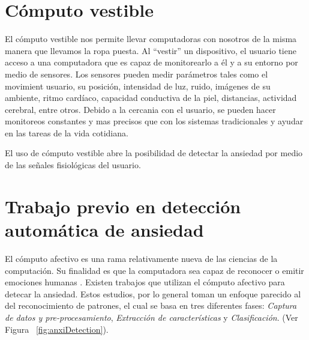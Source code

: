 \section{C\'omputo vestible}\label{secc:dementia}
El c\'omputo vestible nos permite llevar computadoras con nosotros de la misma manera que llevamos la ropa puesta. Al ``vestir'' un dispositivo, el usuario tiene acceso a una computadora que es capaz de monitorearlo a \'el y a su entorno por medio de sensores. Los sensores pueden medir par\'ametros tales como el movimient usuario, su posici\'on, intensidad de luz, ruido, im\'agenes de su ambiente, ritmo card\'iaco, capacidad conductiva de la piel, distancias, actividad cerebral, entre otros. Debido a la cercania con el usuario, se pueden hacer monitoreos constantes y mas precisos que con los sistemas tradicionales y ayudar en las tareas de la vida cotidiana.

El uso de c\'omputo vestible abre la posibilidad de detectar la ansiedad por medio de las se\~nales fisiol\'ogicas del usuario.

\section{Trabajo previo en detecci\'on autom\'atica de ansiedad}
El c\'omputo afectivo es una rama relativamente nueva de las ciencias de la computaci\'on. Su finalidad es que la computadora sea capaz de reconocer o emitir emociones humanas \citep{picard1997affective}. Existen trabajos que utilizan el c\'omputo afectivo para detecar la ansiedad. Estos estudios, por lo general toman un enfoque parecido al del reconocimiento de patrones, el cual se basa en tres diferentes fases: \textit{Captura de datos y pre-procesamiento}, \textit{Extracci\'on de caracter\'isticas} y \textit{Clasificaci\'on}. (Ver Figura ~\ref{fig:anxiDetection}). 

